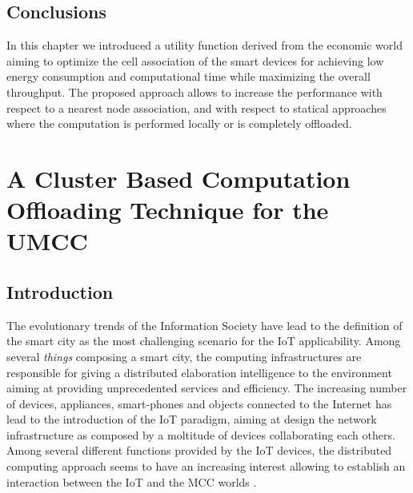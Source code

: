\documentclass[twoside,openright]{report}
\begin{document}
\section{Conclusions}
\label{sec:conclusions2}
In this chapter we introduced a utility function derived from the economic world aiming to optimize the cell association of the smart devices for achieving low energy consumption and computational time while maximizing the overall throughput. 
The proposed approach allows to increase the performance with respect to a nearest node association, and with respect to statical approaches where the computation is performed locally or is completely offloaded.

\chapter[A Cluster Based Computation Offloading  Technique]{A Cluster Based Computation Offloading  Technique for the UMCC}
\label{chap:cluster-based}
\section{Introduction}
\label{sec:intro}
The evolutionary trends of the Information Society have lead to the definition of the smart city as the most challenging scenario for the \gls{IoT} applicability. Among several \emph{things} composing a smart city, the computing infrastructures are responsible for giving a distributed elaboration intelligence to the environment  aiming at providing unprecedented services and efficiency. 
The increasing number of devices, appliances, smart-phones and objects connected to the Internet has lead to the introduction of the \gls{IoT} paradigm, aiming at design the network infrastructure as composed by a moltitude of devices collaborating each others. 
Among several different functions provided by the \gls{IoT} devices, the distributed computing approach seems to have an increasing interest allowing to establish an interaction between the \gls{IoT} and the \gls{MCC} worlds \cite{Miorandi12, Bonomi2012}.
\end{document}
